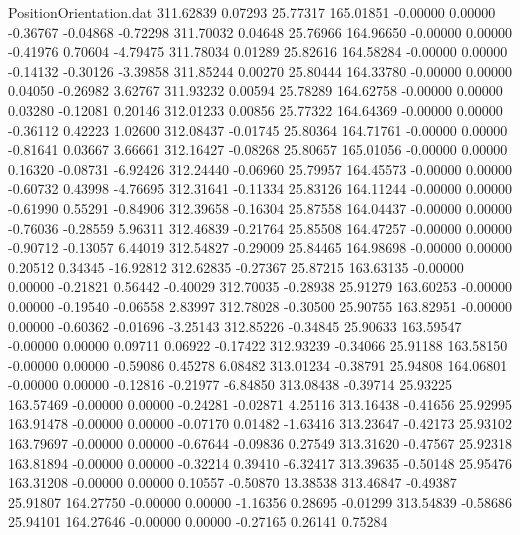 \begin{filecontents}{PositionOrientation.dat}
 311.62839    0.07293   25.77317   165.01851   -0.00000    0.00000   -0.36767   -0.04868   -0.72298
 311.70032    0.04648   25.76966   164.96650   -0.00000    0.00000   -0.41976    0.70604   -4.79475
 311.78034    0.01289   25.82616   164.58284   -0.00000    0.00000   -0.14132   -0.30126   -3.39858
 311.85244    0.00270   25.80444   164.33780   -0.00000    0.00000    0.04050   -0.26982    3.62767
 311.93232    0.00594   25.78289   164.62758   -0.00000    0.00000    0.03280   -0.12081    0.20146
 312.01233    0.00856   25.77322   164.64369   -0.00000    0.00000   -0.36112    0.42223    1.02600
 312.08437   -0.01745   25.80364   164.71761   -0.00000    0.00000   -0.81641    0.03667    3.66661
 312.16427   -0.08268   25.80657   165.01056   -0.00000    0.00000    0.16320   -0.08731   -6.92426
 312.24440   -0.06960   25.79957   164.45573   -0.00000    0.00000   -0.60732    0.43998   -4.76695
 312.31641   -0.11334   25.83126   164.11244   -0.00000    0.00000   -0.61990    0.55291   -0.84906
 312.39658   -0.16304   25.87558   164.04437   -0.00000    0.00000   -0.76036   -0.28559    5.96311
 312.46839   -0.21764   25.85508   164.47257   -0.00000    0.00000   -0.90712   -0.13057    6.44019
 312.54827   -0.29009   25.84465   164.98698   -0.00000    0.00000    0.20512    0.34345  -16.92812
 312.62835   -0.27367   25.87215   163.63135   -0.00000    0.00000   -0.21821    0.56442   -0.40029
 312.70035   -0.28938   25.91279   163.60253   -0.00000    0.00000   -0.19540   -0.06558    2.83997
 312.78028   -0.30500   25.90755   163.82951   -0.00000    0.00000   -0.60362   -0.01696   -3.25143
 312.85226   -0.34845   25.90633   163.59547   -0.00000    0.00000    0.09711    0.06922   -0.17422
 312.93239   -0.34066   25.91188   163.58150   -0.00000    0.00000   -0.59086    0.45278    6.08482
 313.01234   -0.38791   25.94808   164.06801   -0.00000    0.00000   -0.12816   -0.21977   -6.84850
 313.08438   -0.39714   25.93225   163.57469   -0.00000    0.00000   -0.24281   -0.02871    4.25116
 313.16438   -0.41656   25.92995   163.91478   -0.00000    0.00000   -0.07170    0.01482   -1.63416
 313.23647   -0.42173   25.93102   163.79697   -0.00000    0.00000   -0.67644   -0.09836    0.27549
 313.31620   -0.47567   25.92318   163.81894   -0.00000    0.00000   -0.32214    0.39410   -6.32417
 313.39635   -0.50148   25.95476   163.31208   -0.00000    0.00000    0.10557   -0.50870   13.38538
 313.46847   -0.49387   25.91807   164.27750   -0.00000    0.00000   -1.16356    0.28695   -0.01299
 313.54839   -0.58686   25.94101   164.27646   -0.00000    0.00000   -0.27165    0.26141    0.75284

\end{filecontents}
